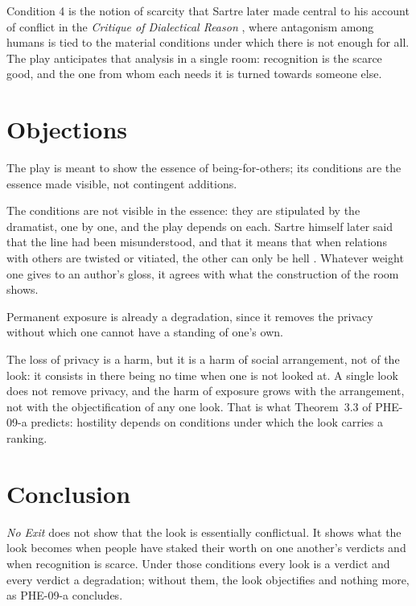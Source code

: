 \documentclass{situationist-preprint}
\begin{document}
Condition 4 is the notion of scarcity that Sartre later made central to his account of conflict in the \emph{Critique of Dialectical Reason} \citep{Sartre1960}, where antagonism among humans is tied to the material conditions under which there is not enough for all. The play anticipates that analysis in a single room: recognition is the scarce good, and the one from whom each needs it is turned towards someone else.

\section{Objections}

\begin{objection}
The play is meant to show the essence of being-for-others; its conditions are the essence made visible, not contingent additions.
\end{objection}

\begin{reply}
The conditions are not visible in the essence: they are stipulated by the dramatist, one by one, and the play depends on each. Sartre himself later said that the line had been misunderstood, and that it means that when relations with others are twisted or vitiated, the other can only be hell \citep{ContatRybalka1970}. Whatever weight one gives to an author's gloss, it agrees with what the construction of the room shows.
\end{reply}

\begin{objection}
Permanent exposure is already a degradation, since it removes the privacy without which one cannot have a standing of one's own.
\end{objection}

\begin{reply}
The loss of privacy is a harm, but it is a harm of social arrangement, not of the look: it consists in there being no time when one is not looked at. A single look does not remove privacy, and the harm of exposure grows with the arrangement, not with the objectification of any one look. That is what Theorem~3.3 of PHE-09-a predicts: hostility depends on conditions under which the look carries a ranking.
\end{reply}

\section{Conclusion}

\emph{No Exit} does not show that the look is essentially conflictual. It shows what the look becomes when people have staked their worth on one another's verdicts and when recognition is scarce. Under those conditions every look is a verdict and every verdict a degradation; without them, the look objectifies and nothing more, as PHE-09-a concludes.
\end{document}
